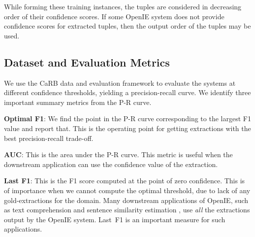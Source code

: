         While forming these training instances, the tuples are considered in decreasing order of their confidence scores.  If some OpenIE system does not provide confidence scores for extracted tuples, then the output order of the tuples may be used.  

    \subsection{Dataset and Evaluation Metrics}

        We use the CaRB data and evaluation framework \cite{bhardwaj&al19} to evaluate the systems at different confidence thresholds, yielding a precision-recall curve. We identify three important summary metrics from the P-R curve. 

        \noindent \textbf{Optimal F1}: We find the point in the P-R curve corresponding to the largest F1 value and report that.  This is the operating point for getting extractions with the best precision-recall trade-off.

        \noindent \textbf{AUC}: This is the area under the P-R curve. This metric is useful when the downstream application can use the confidence value of the extraction.

        \noindent \textbf{Last F1}: This is the F1 score computed at the point of zero confidence. This is of importance when we cannot compute the optimal threshold, due to lack of any gold-extractions for the domain. Many downstream applications of OpenIE, such as text comprehension \citep{stanovsky&al15} and sentence similarity estimation \citep{janara&al14}, use \emph{all} the extractions output by the OpenIE system. Last~F1 is an important measure for such applications.

